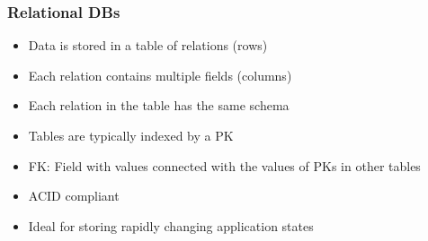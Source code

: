 \documentclass[11pt]{scrartcl}
\begin{document}
\subsubsection*{Relational DBs}
\begin{itemize}
	\item Data is stored in a table of relations (rows)
	\item Each relation contains multiple fields (columns)
	\item Each relation in the table has the same schema
	\item Tables are typically indexed by a PK
	\item FK: Field with values connected with the values of PKs in other tables
	\item ACID compliant
	\item Ideal for storing rapidly changing application states
\end{itemize}
\end{document}
